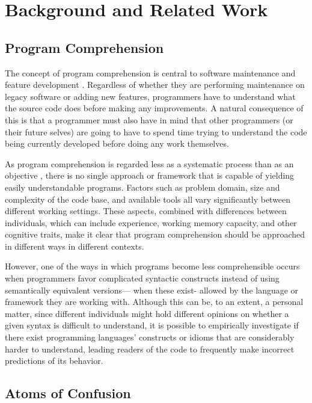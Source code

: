 \section{Background and Related Work}
\label{back}
\subsection{Program Comprehension}

The concept of program comprehension is central to software maintenance and feature development \cite{DBLP:conf/iwpc/TilleySP96}. Regardless of whether they are performing maintenance on legacy software or adding new features, programmers have to understand what the source code does before making any improvements. A natural consequence of this is that a programmer must also have in mind that other programmers (or their future selves) are going to have to spend time trying to understand the code being currently developed before doing any work themselves.

As program comprehension is regarded less as a systematic process than as an objective \cite{DBLP:journals/ibmsj/OHareT94}, there is no single approach or framework that is capable of yielding easily understandable programs. Factors such as problem domain, size and complexity of the code base, and available tools all vary significantly between different working settings. These aspects, combined with differences between individuals, which can include experience, working memory capacity, and other cognitive traits, make it clear that program comprehension should be approached in different ways in different contexts. 

However, one of the ways in which programs become less comprehensible occurs when programmers favor complicated syntactic constructs instead of using semantically equivalent versions--- when these exist- allowed by the language or framework they are working with. Although this can be, to an extent, a personal matter, since different individuals might hold different opinions on whether a given syntax is difficult to understand, it is possible to empirically investigate if there exist programming languages' constructs or idioms that are considerably harder to understand, leading readers of the code to frequently make incorrect predictions of its behavior. 

\subsection{Atoms of Confusion}\label{sec:aoc}

